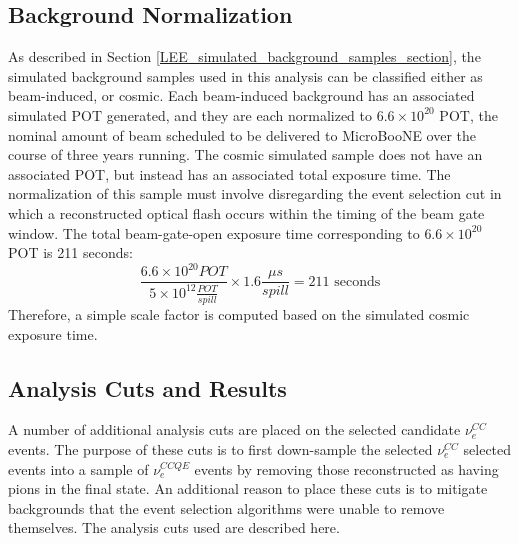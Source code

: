 \subsection{Background Normalization}\label{LEE_background_normalization_section}
As described in Section \ref{LEE_simulated_background_samples_section}, the simulated background samples used in this analysis can be classified either as beam-induced, or cosmic. Each beam-induced background has an associated simulated POT generated, and they are each normalized to $6.6\times10^{20}$ POT, the nominal amount of beam scheduled to be delivered to MicroBooNE over the course of three years running. The cosmic simulated sample does not have an associated POT, but instead has an associated total exposure time. The normalization of this sample must involve disregarding the event selection cut in which a reconstructed optical flash occurs within the timing of the beam gate window. The total beam-gate-open exposure time corresponding to $6.6\times10^{20}$ POT is 211 seconds:
\begin{equation}
\frac{6.6\times10^{20} POT}{5 \times 10^{12} \frac{POT}{spill}} \times 1.6\frac{\mu s}{spill} = 211 \text{ seconds}
\end{equation}
Therefore, a simple scale factor is computed based on the simulated cosmic exposure time.%


\subsection{Analysis Cuts and Results}\label{analysis_cut_descript_section}


A number of additional analysis cuts are placed on the selected candidate $\nu_e^{CC}$ events. The purpose of these cuts is to first down-sample the selected $\nu_e^{CC}$ selected events into a sample of $\nu_e^{CCQE}$ events by removing those reconstructed as having pions in the final state. An additional reason to place these cuts is to mitigate backgrounds that the event selection algorithms were unable to remove themselves. The analysis cuts used are described here.\\

